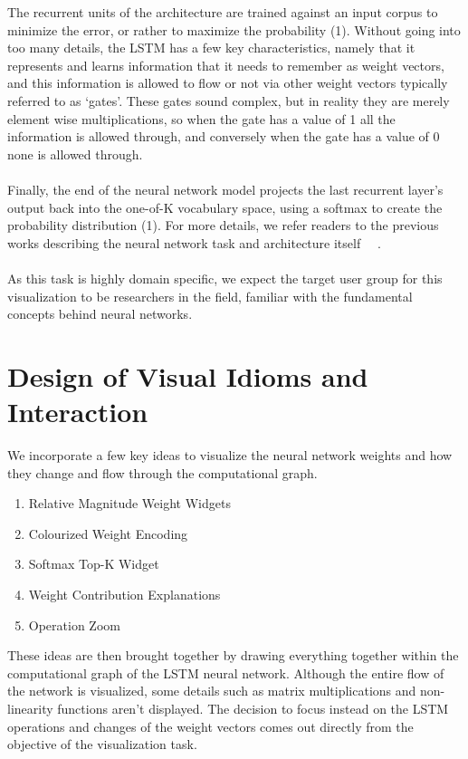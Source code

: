 \documentclass[journal]{vgtc}                %
\begin{document}
The recurrent units of the architecture are trained against an input corpus to minimize the error, or rather to maximize the probability (1).
Without going into too many details, the LSTM has a few key characteristics, namely that it represents and learns information that it needs to remember as weight vectors, and this information is allowed to flow or not via other weight vectors typically referred to as `gates'.
These gates sound complex, but in reality they are merely element wise multiplications, so when the gate has a value of 1 all the information is allowed through, and conversely when the gate has a value of 0 none is allowed through.
\\
\\
Finally, the end of the neural network model projects the last recurrent layer's output back into the one-of-K vocabulary space, using a softmax to create the probability distribution (1).
For more details, we refer readers to the previous works describing the neural network task and architecture itself ~\cite{lstm}~\cite{lstmlm}.
\\
\\
As this task is highly domain specific, we expect the target user group for this visualization to be researchers in the field, familiar with the fundamental concepts behind neural networks.

\section{Design of Visual Idioms and Interaction}
We incorporate a few key ideas to visualize the neural network weights and how they change and flow through the computational graph.
\begin{enumerate}
    \item Relative Magnitude Weight Widgets
    \item Colourized Weight Encoding
    \item Softmax Top-K Widget
    \item Weight Contribution Explanations
    \item Operation Zoom
\end{enumerate}
These ideas are then brought together by drawing everything together within the computational graph of the LSTM neural network.
Although the entire flow of the network is visualized, some details such as matrix multiplications and non-linearity functions aren't displayed.
The decision to focus instead on the LSTM operations and changes of the weight vectors comes out directly from the objective of the visualization task.
\end{document}
